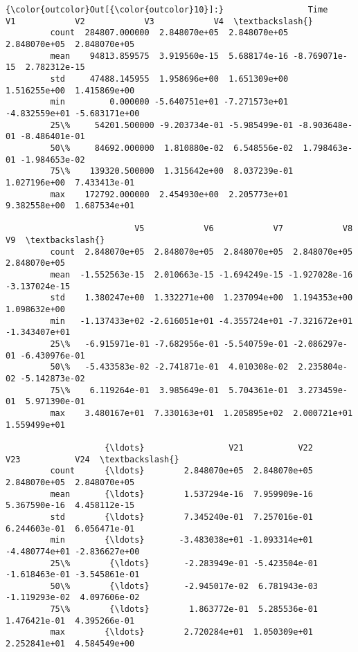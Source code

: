 \documentclass[11pt]{article}
\begin{document}
\begin{Verbatim}[commandchars=\\\{\}]
{\color{outcolor}Out[{\color{outcolor}10}]:}                 Time            V1            V2            V3            V4  \textbackslash{}
         count  284807.000000  2.848070e+05  2.848070e+05  2.848070e+05  2.848070e+05   
         mean    94813.859575  3.919560e-15  5.688174e-16 -8.769071e-15  2.782312e-15   
         std     47488.145955  1.958696e+00  1.651309e+00  1.516255e+00  1.415869e+00   
         min         0.000000 -5.640751e+01 -7.271573e+01 -4.832559e+01 -5.683171e+00   
         25\%     54201.500000 -9.203734e-01 -5.985499e-01 -8.903648e-01 -8.486401e-01   
         50\%     84692.000000  1.810880e-02  6.548556e-02  1.798463e-01 -1.984653e-02   
         75\%    139320.500000  1.315642e+00  8.037239e-01  1.027196e+00  7.433413e-01   
         max    172792.000000  2.454930e+00  2.205773e+01  9.382558e+00  1.687534e+01   
         
                          V5            V6            V7            V8            V9  \textbackslash{}
         count  2.848070e+05  2.848070e+05  2.848070e+05  2.848070e+05  2.848070e+05   
         mean  -1.552563e-15  2.010663e-15 -1.694249e-15 -1.927028e-16 -3.137024e-15   
         std    1.380247e+00  1.332271e+00  1.237094e+00  1.194353e+00  1.098632e+00   
         min   -1.137433e+02 -2.616051e+01 -4.355724e+01 -7.321672e+01 -1.343407e+01   
         25\%   -6.915971e-01 -7.682956e-01 -5.540759e-01 -2.086297e-01 -6.430976e-01   
         50\%   -5.433583e-02 -2.741871e-01  4.010308e-02  2.235804e-02 -5.142873e-02   
         75\%    6.119264e-01  3.985649e-01  5.704361e-01  3.273459e-01  5.971390e-01   
         max    3.480167e+01  7.330163e+01  1.205895e+02  2.000721e+01  1.559499e+01   
         
                    {\ldots}                 V21           V22           V23           V24  \textbackslash{}
         count      {\ldots}        2.848070e+05  2.848070e+05  2.848070e+05  2.848070e+05   
         mean       {\ldots}        1.537294e-16  7.959909e-16  5.367590e-16  4.458112e-15   
         std        {\ldots}        7.345240e-01  7.257016e-01  6.244603e-01  6.056471e-01   
         min        {\ldots}       -3.483038e+01 -1.093314e+01 -4.480774e+01 -2.836627e+00   
         25\%        {\ldots}       -2.283949e-01 -5.423504e-01 -1.618463e-01 -3.545861e-01   
         50\%        {\ldots}       -2.945017e-02  6.781943e-03 -1.119293e-02  4.097606e-02   
         75\%        {\ldots}        1.863772e-01  5.285536e-01  1.476421e-01  4.395266e-01   
         max        {\ldots}        2.720284e+01  1.050309e+01  2.252841e+01  4.584549e+00   
         

\end{Verbatim}
\end{document}
